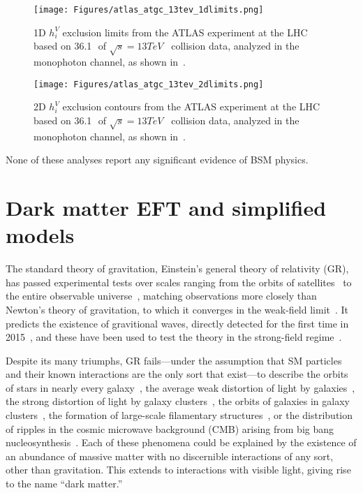 \begin{figure}[hbtp]
  \begin{center}
    \texttt{[image: Figures/atlas\_atgc\_13tev\_1dlimits.png]}
    \caption{
      1D $h_{i}^{V}$ exclusion limits from the ATLAS experiment at the LHC based on 36.1\,\fbinv\ of $\sqrt{s} = 13\unit{TeV}$
      \Pp\Pp\ collision data, analyzed in the monophoton channel, as shown in~\cite{ref:CERN-EP-2018-220}.
    }
    \label{fig:atlas_atgc_13tev_1dlimits}
  \end{center}
\end{figure}

\begin{figure}[hbtp]
  \begin{center}
    \texttt{[image: Figures/atlas\_atgc\_13tev\_2dlimits.png]}
    \caption{
      2D $h_{i}^{V}$ exclusion contours from the ATLAS experiment at the LHC based on 36.1\,\fbinv\ of $\sqrt{s} = 13\unit{TeV}$
      \Pp\Pp\ collision data, analyzed in the monophoton channel, as shown in~\cite{ref:CERN-EP-2018-220}.
    }
    \label{fig:atlas_atgc_13tev_2dlimits}
  \end{center}
\end{figure}

None of these analyses report any significant evidence of BSM physics.

\section{Dark matter EFT and simplified models} \label{sec:introduction_dm}
The standard theory of gravitation, Einstein's
general theory of relativity (GR), has passed experimental tests over scales ranging from the orbits of satellites~\cite{ref:lrr-2003-1} to the entire observable universe~\cite{ref:planck2018_cosparams},
matching observations more closely than Newton's theory of gravitation, to which it converges in the weak-field limit~\cite{ref:WaldGR}.
It predicts the existence of gravitional waves, directly detected for the first time in 2015~\cite{ref:PhysRevLett.116.061102}, and these have been used to test the theory in the strong-field regime~\cite{ref:PhysRevLett.116.221101}.

Despite its many triumphs, GR fails---under the assumption that SM particles and their known interactions are the only sort that exist---to describe the orbits of stars in nearly every galaxy~\cite{ref:nature25767},
the average weak distortion of light by galaxies~\cite{ref:weaklensing}, the strong distortion of light by galaxy clusters~\cite{ref:mnras/stw3385}, the orbits of galaxies in galaxy clusters~\cite{ref:annurev-astro-081710-102514},
the formation of large-scale filamentary structures~\cite{ref:nature03597}, or the distribution of ripples in the cosmic microwave background (CMB) arising from big bang nucleosynthesis~\cite{ref:planck2018_cosparams}.
Each of these phenomena could be explained by the existence of an abundance of massive matter with no discernible interactions of any sort, other than gravitation.
This extends to interactions with visible light, giving rise to the name ``dark matter.''

